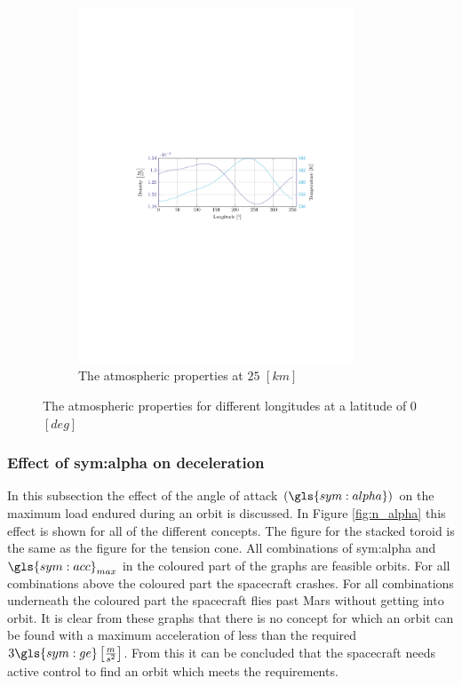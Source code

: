 \begin{figure}[ht!]
\begin{subfigure}{0.9\textwidth}
	\includegraphics[trim={4.5cm 11cm 3.1cm 11cm},clip,width=0.9\textwidth]{Figure/atmos_model/lon_25.pdf}
	\caption{The atmospheric properties at $25$ $\left[km\right]$} 
	\label{fig:atmos_lon_25}
	\end{subfigure}
	\caption{The atmospheric properties for different longitudes at a latitude of 0 $\left[deg\right]$}
	\label{fig:atmos_lon}
\end{figure}

\subsubsection{Effect of \gls{sym:alpha} on deceleration}
\label{sec:astrodec}

In this subsection the effect of the angle of attack $\left(\gls{sym:alpha}\right)$ on the maximum load endured during an orbit is discussed. In Figure \ref{fig:n_alpha} this effect is shown for all of the different concepts. The figure for the stacked toroid is the same as the figure for the tension cone. All combinations of \gls{sym:alpha} and $\gls{sym:acc}_{max}$ in the coloured part of the graphs are feasible orbits. For all combinations above the coloured part the spacecraft crashes. For all combinations underneath the coloured part the spacecraft flies past Mars without getting into orbit. It is clear from these graphs that there is no concept for which an orbit can be found with a maximum acceleration of less than the required $3 \gls{sym:ge} \left[\frac{m}{s^2}\right]$. From this it can be concluded that the spacecraft needs active control to find an orbit which meets the requirements.

